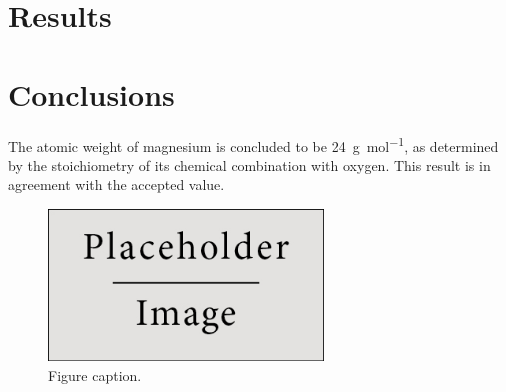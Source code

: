 \documentclass{article}
\begin{document}
\section{Results}




\section{Conclusions}

The atomic weight of magnesium is concluded to be \SI{24}{\gram\per\mol}, as determined by the stoichiometry of its chemical combination with oxygen. This result is in agreement with the accepted value.

\begin{figure}[h]
\begin{center}
\includegraphics[width=0.65\textwidth]{placeholder} %
\caption{Figure caption.}
\end{center}
\end{figure}





\end{document}
